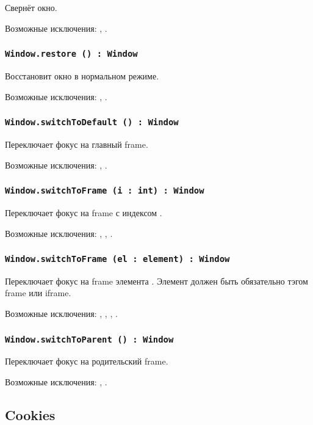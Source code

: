 Свернёт окно.

Возможные исключения: , .

\subsubsection{\lstinline|Window.restore () : Window|}

Восстановит окно в нормальном режиме.

Возможные исключения: , .

\subsubsection{\lstinline|Window.switchToDefault () : Window|}

Переключает фокус на главный frame.

Возможные исключения: , .

\subsubsection{\lstinline|Window.switchToFrame (i : int) : Window|}

Переключает фокус на frame с индексом .

Возможные исключения: , , .

\subsubsection{\lstinline|Window.switchToFrame (el : element) : Window|}

Переключает фокус на frame элемента . Элемент должен быть обязательно тэгом frame или iframe.

Возможные исключения: , , , .

\subsubsection{\lstinline|Window.switchToParent () : Window|}

Переключает фокус на родительский frame.

Возможные исключения: , .

\subsection{{\color{orange} Cookies}}


